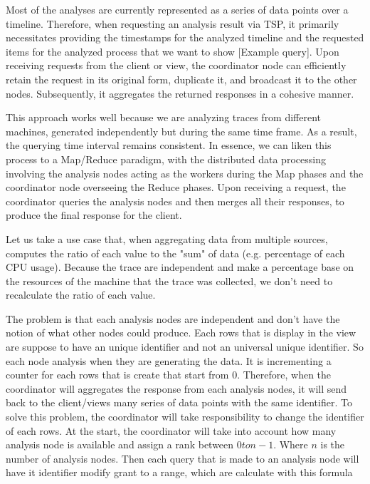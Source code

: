 Most of the analyses are currently represented as a series of data points over a timeline. Therefore, when requesting an analysis result via TSP, it primarily necessitates providing the timestamps for the analyzed timeline and the requested items for the analyzed process that we want to show [Example query]. Upon receiving requests from the client or view, the coordinator node can efficiently retain the request in its original form, duplicate it, and broadcast it to the other nodes. Subsequently, it aggregates the returned responses in a cohesive manner.

This approach works well because we are analyzing traces from different machines, generated independently but during the same time frame. As a result, the querying time interval remains consistent. In essence, we can liken this process to a Map/Reduce paradigm, with the distributed data processing involving the analysis nodes acting as the workers during the Map phases and the coordinator node overseeing the Reduce phases. Upon receiving a request, the coordinator queries the analysis nodes and then merges all their responses, to produce the final response for the client. 

Let us take a use case that, when aggregating data from multiple sources, computes the ratio of each value to the "sum" of data (e.g. percentage of each CPU usage). Because the trace are independent and make a percentage base on the resources of the machine that the trace was collected, we don't need to recalculate the ratio of each value. 

The problem is that each analysis nodes are independent and don't have the notion of what other nodes could produce. Each rows that is display in the view are suppose to have an unique identifier and not an universal unique identifier. So each node analysis when they are generating the data. It is incrementing a counter for each rows that is create that start from 0. Therefore, when the coordinator will aggregates the response from each analysis nodes, it will send back to the client/views many series of data points with the same identifier. To solve this problem, the coordinator will take responsibility to change the identifier of each rows. At the start, the coordinator will take into account how many analysis node is available and assign a rank between $0 to n-1$. Where $n$ is the number of analysis nodes. Then each query that is made to an analysis node will have it identifier modify grant to a range, which are calculate with this formula 

